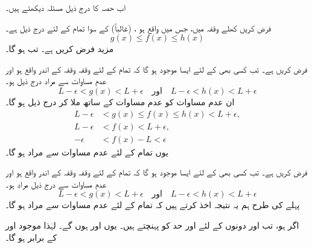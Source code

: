 اب حصہ   کا درج ذیل    مسئلہ   دیکھتے ہیں۔

\quad 
فرض کریں کھلے  وقفہ   میں، جس میں   واقع  ہو ،  (غالباً)  کے سوا تمام  کے
 لئے درج ذیل ہے۔
\[{g(x)\le f(x)\le h(x)}\]
 مزید فرض کریں  ہے۔ تب  ہو گا۔

\quad
فرض کریں   ہے۔ تب  کسی بھی  کے لئے ایسا  موجود ہو گا کہ تمام  کے لئے وقفہ  وقفہ    کے اندر واقع ہو اور  عدم مساوات سے مراد درج ذیل ہو۔
\[L-\epsilon<g(x)<L+\epsilon\quad \text{اور} \quad L-\epsilon<h(x)<L+\epsilon\]
ان عدم مساوات  کو عدم مساوات      کے ساتھ ملا کر درج ذیل ہو گا۔
\begin{align*}
L-\epsilon&<g(x)\le f(x)\le h(x)<L+\epsilon,\\
L-\epsilon&<f(x)<L+\epsilon,\\
-\epsilon&<f(x)-L<\epsilon
\end{align*}
یوں تمام  کے لئے عدم مساوات  سے مراد  ہو گا۔

\quad
فرض کریں  ہے۔ تب کسی بھی  کے لئے  ایسا  موجود ہو گا کہ تمام   کے لئے وقفہ  وقفہ  کے اندر واقع ہو اور عدم مساوات سے درج ذیل مراد ہو۔
\[L-\epsilon<g(x)<L+\epsilon\quad\text{اور}\quad L-\epsilon<h(x)<L+\epsilon\]
پہلے کی طرح ہم یہ نتیجہ اخذ کرتے ہیں کہ  تمام  کے لئے عدم مساوات  سے مراد  ہو گا۔

\quad 
اگر  ہو، تب   اور  دونوں  کے لئے  اور   حد   کو پہنچتے ہیں۔ یوں  اور     ہوں گے۔ لہٰذا  موجود   اور  کے برابر ہو گا۔

